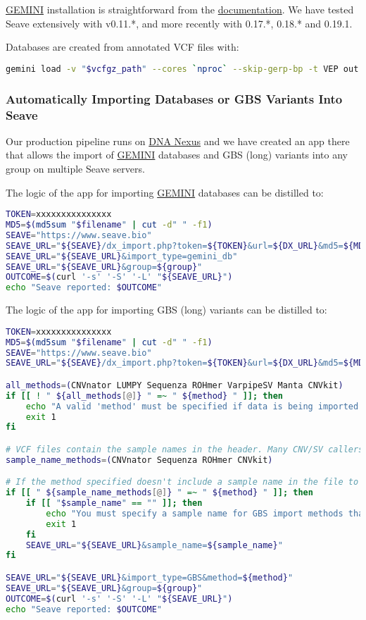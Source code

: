 \documentclass[11pt, a4paper]{article}
\newcommand{\GEMINI}{\href{https://gemini.readthedocs.io}{GEMINI} } %
\begin{document}
\GEMINI installation is straightforward from the \href{https://gemini.readthedocs.io/en/latest/#new-installation}{documentation}. We have tested Seave extensively with v0.11.*, and more recently with 0.17.*, 0.18.* and 0.19.1.

Databases are created from annotated VCF files with:

\begin{lstlisting}[language=bash]
gemini load -v "$vcfgz_path" --cores `nproc` --skip-gerp-bp -t VEP out.db
\end{lstlisting}

\subsubsection{Automatically Importing Databases or GBS Variants Into Seave}

Our production pipeline runs on \href{https://www.dnanexus.com}{DNA Nexus} and we have created an app there that allows the import of \GEMINI databases and GBS (long) variants into any group on multiple Seave servers.

The logic of the app for importing \GEMINI databases can be distilled to:

\begin{lstlisting}[language=bash]
TOKEN=xxxxxxxxxxxxxxx
MD5=$(md5sum "$filename" | cut -d" " -f1)
SEAVE="https://www.seave.bio"
SEAVE_URL="${SEAVE}/dx_import.php?token=${TOKEN}&url=${DX_URL}&md5=${MD5}"
SEAVE_URL="${SEAVE_URL}&import_type=gemini_db"
SEAVE_URL="${SEAVE_URL}&group=${group}"
OUTCOME=$(curl '-s' '-S' '-L' "${SEAVE_URL}")
echo "Seave reported: $OUTCOME"
\end{lstlisting}

The logic of the app for importing GBS (long) variants can be distilled to:

\begin{lstlisting}[language=bash]
TOKEN=xxxxxxxxxxxxxxx
MD5=$(md5sum "$filename" | cut -d" " -f1)
SEAVE="https://www.seave.bio"
SEAVE_URL="${SEAVE}/dx_import.php?token=${TOKEN}&url=${DX_URL}&md5=${MD5}"

all_methods=(CNVnator LUMPY Sequenza ROHmer VarpipeSV Manta CNVkit)
if [[ ! " ${all_methods[@]} " =~ " ${method} " ]]; then
	echo "A valid 'method' must be specified if data is being imported into the GBS."
	exit 1
fi

# VCF files contain the sample names in the header. Many CNV/SV callers produce TSV files, so you also need to specify the sample name.
sample_name_methods=(CNVnator Sequenza ROHmer CNVkit)

# If the method specified doesn't include a sample name in the file to import, make sure the user specified one
if [[ " ${sample_name_methods[@]} " =~ " ${method} " ]]; then
	if [[ "$sample_name" == "" ]]; then
		echo "You must specify a sample name for GBS import methods that don't include a sample name in the file to import"
		exit 1
	fi
	SEAVE_URL="${SEAVE_URL}&sample_name=${sample_name}"
fi

SEAVE_URL="${SEAVE_URL}&import_type=GBS&method=${method}"
SEAVE_URL="${SEAVE_URL}&group=${group}"
OUTCOME=$(curl '-s' '-S' '-L' "${SEAVE_URL}")
echo "Seave reported: $OUTCOME"
\end{lstlisting}
\end{document}
